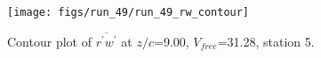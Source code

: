 \begin{figure}[H]
\centering
\texttt{[image: figs/run\_49/run\_49\_rw\_contour]}
\caption{Contour plot of $\overline{r^\prime w^\prime}$ at $z/c$=9.00, $V_{free}$=31.28, station 5.}
\label{fig:run_49_rw_contour}
\end{figure}


